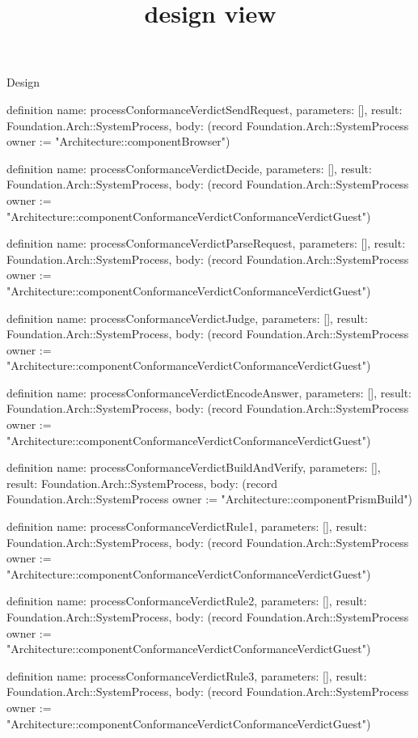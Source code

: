 \begin{lexlean}{Design}
\title{design view}
\begin{semanticmodule}
definition{
  name: processConformanceVerdictSendRequest,
  parameters: [],
  result: Foundation.Arch::SystemProcess,
  body: (record Foundation.Arch::SystemProcess {owner := "Architecture::componentBrowser"})
}

definition{
  name: processConformanceVerdictDecide,
  parameters: [],
  result: Foundation.Arch::SystemProcess,
  body: (record Foundation.Arch::SystemProcess {owner := "Architecture::componentConformanceVerdictConformanceVerdictGuest"})
}

definition{
  name: processConformanceVerdictParseRequest,
  parameters: [],
  result: Foundation.Arch::SystemProcess,
  body: (record Foundation.Arch::SystemProcess {owner := "Architecture::componentConformanceVerdictConformanceVerdictGuest"})
}

definition{
  name: processConformanceVerdictJudge,
  parameters: [],
  result: Foundation.Arch::SystemProcess,
  body: (record Foundation.Arch::SystemProcess {owner := "Architecture::componentConformanceVerdictConformanceVerdictGuest"})
}

definition{
  name: processConformanceVerdictEncodeAnswer,
  parameters: [],
  result: Foundation.Arch::SystemProcess,
  body: (record Foundation.Arch::SystemProcess {owner := "Architecture::componentConformanceVerdictConformanceVerdictGuest"})
}

definition{
  name: processConformanceVerdictBuildAndVerify,
  parameters: [],
  result: Foundation.Arch::SystemProcess,
  body: (record Foundation.Arch::SystemProcess {owner := "Architecture::componentPrismBuild"})
}

definition{
  name: processConformanceVerdictRule1,
  parameters: [],
  result: Foundation.Arch::SystemProcess,
  body: (record Foundation.Arch::SystemProcess {owner := "Architecture::componentConformanceVerdictConformanceVerdictGuest"})
}

definition{
  name: processConformanceVerdictRule2,
  parameters: [],
  result: Foundation.Arch::SystemProcess,
  body: (record Foundation.Arch::SystemProcess {owner := "Architecture::componentConformanceVerdictConformanceVerdictGuest"})
}

definition{
  name: processConformanceVerdictRule3,
  parameters: [],
  result: Foundation.Arch::SystemProcess,
  body: (record Foundation.Arch::SystemProcess {owner := "Architecture::componentConformanceVerdictConformanceVerdictGuest"})
}


\end{semanticmodule}
\end{lexlean}
